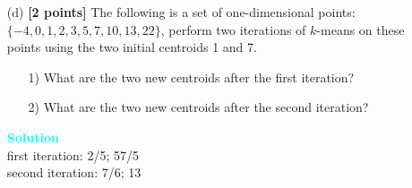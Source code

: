 \documentclass[10pt]{article}
\newenvironment{solution}
    { \begin{mdframed}[backgroundcolor=gray!10] \textcolor{cyan}{\textbf{Solution}} \\}
    {  \end{mdframed}}
\begin{document}
\begin{enumerate}
\begin{itemize}
		      \item[(d)] \textbf{[2 points]}
		            The following is a set of one-dimensional points: $\{-4, 0, 1, 2, 3, 5, 7, 10, 13, 22\}$, perform two iterations of $k$-means on these points using the two initial centroids 1 and 7.
		            \begin{itemize}
			            \item[1)] What are the two new centroids after the first iteration?
			            \item[2)] What are the two new centroids after the second iteration?
		            \end{itemize}
		            \begin{solution}
			            first iteration: 2/5; 57/5\\
			            second iteration: 7/6; 13
		            \end{solution}
	      \end{itemize}


\end{enumerate}
\end{document}
